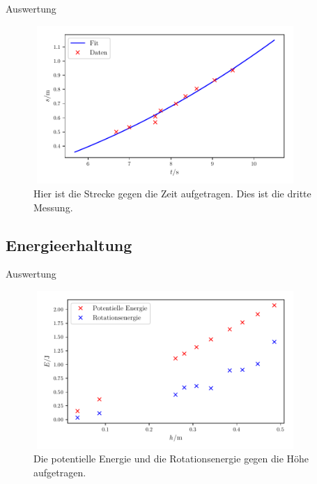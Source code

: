 \begin{frame}{Auswertung}
    \begin{figure}   
    
    \centering
    \includegraphics[width=10cm, height=6cm]{build/plot3a.pdf}
    \caption{Hier ist die Strecke gegen die Zeit aufgetragen. Dies ist die dritte Messung.} 

    \label{fig:plot3a}
\end{figure}
\end{frame}
\subsection{Energieerhaltung}
\begin{frame}{Auswertung}
    \begin{figure}   
    
    \centering
    \includegraphics[width=10cm, height=6cm]{build/plot4a.pdf}
    \caption{Die potentielle Energie und die Rotationsenergie gegen die Höhe aufgetragen.} 

    \label{fig:plot4}
\end{figure}
\end{frame}

